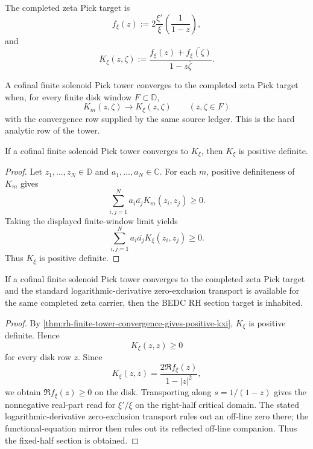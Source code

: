 \begin{definition}
\label{def:rh-completed-zeta-pick-target}
The completed zeta Pick target is
$$
f_{\xi}(z)
:=
2\frac{\xi'}{\xi}\left(\frac{1}{1-z}\right),
$$
and
$$
K_{\xi}(z,\zeta)
:=
\frac{f_{\xi}(z)+\overline{f_{\xi}(\zeta)}}{1-z\overline{\zeta}}.
$$
\end{definition}

\begin{definition}
\label{def:rh-triadic-solenoid-pick-tower-convergence}
A cofinal finite solenoid Pick tower converges to the completed zeta Pick
target when, for every finite disk window $F\subset\mathbb D$,
$$
K_m(z,\zeta)\to K_{\xi}(z,\zeta)
\qquad
(z,\zeta\in F)
$$
with the convergence row supplied by the same source ledger. This is the
hard analytic row of the tower.
\end{definition}

\begin{theorem}
\label{thm:rh-finite-tower-convergence-gives-positive-kxi}
If a cofinal finite solenoid Pick tower converges to
$K_{\xi}$, then $K_{\xi}$ is positive definite.
\end{theorem}

\begin{proof}
Let $z_1,\ldots,z_N\in\mathbb D$ and $a_1,\ldots,a_N\in\mathbb C$. For
each $m$, positive definiteness of $K_m$ gives
$$
\sum_{i,j=1}^{N}a_i\overline{a_j}K_m(z_i,z_j)\ge0.
$$
Taking the displayed finite-window limit yields
$$
\sum_{i,j=1}^{N}a_i\overline{a_j}K_{\xi}(z_i,z_j)\ge0.
$$
Thus $K_{\xi}$ is positive definite.
\end{proof}

\begin{theorem}
\label{thm:rh-triadic-solenoid-pick-tower-conditionally-sufficient}
If a cofinal finite solenoid Pick tower converges to the completed zeta
Pick target and the standard logarithmic-derivative zero-exclusion
transport is available for the same completed zeta carrier, then the BEDC
RH section target is inhabited.
\end{theorem}

\begin{proof}
By \autoref{thm:rh-finite-tower-convergence-gives-positive-kxi},
$K_{\xi}$ is positive definite. Hence
$$
K_{\xi}(z,z)\ge0
$$
for every disk row $z$. Since
$$
K_{\xi}(z,z)
=
\frac{2\Re f_{\xi}(z)}{1-|z|^2},
$$
we obtain $\Re f_{\xi}(z)\ge0$ on the disk. Transporting along
$s=1/(1-z)$ gives the nonnegative real-part read for
$\xi'/\xi$ on the right-half critical domain. The stated
logarithmic-derivative zero-exclusion transport rules out an off-line zero
there; the functional-equation mirror then rules out its reflected
off-line companion. Thus the fixed-half section is obtained.
\end{proof}

